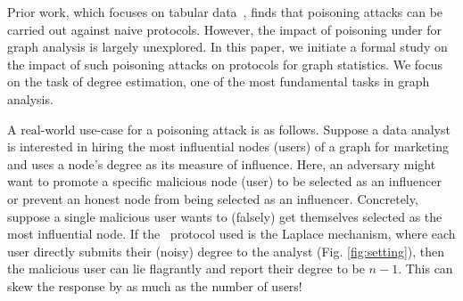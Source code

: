 Prior work, which focuses on tabular data~\cite{Cheu21,Cao21,Li22}, finds that  poisoning attacks can be carried out against naive \ldp{} protocols. However, the impact of poisoning under \ldp{} for graph analysis is largely unexplored. In this paper, we initiate a formal study on the impact of such poisoning attacks on \ldp{} protocols for graph statistics. We focus on the task of degree estimation, one of the most fundamental tasks in graph analysis. 

A real-world use-case for a poisoning attack is as follows. Suppose a data analyst is interested in hiring the most influential nodes (users) of a graph for marketing and uses a node's degree as its measure of influence.  Here, an adversary might want to promote a specific malicious node (user) to be selected as an influencer or prevent an honest node from being selected as an influencer. Concretely, suppose a single malicious user wants to (falsely) get themselves selected as the most influential node. If the \ldp~protocol used is the Laplace mechanism, where each user directly submits their (noisy) degree to the analyst (Fig. \ref{fig:setting}), then the malicious user can lie flagrantly and report their degree to be $n-1$. This can skew the response by as much as the number of users!






